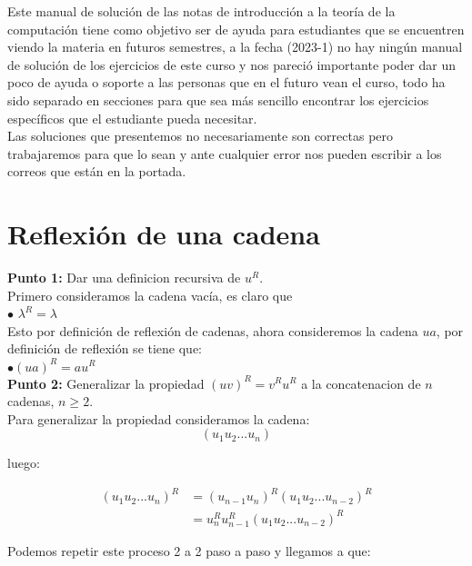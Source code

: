 Este manual de solución de las notas de introducción a la teoría de la computación tiene como objetivo ser de ayuda para estudiantes que se encuentren viendo la materia en futuros semestres, a la fecha (2023-1) no hay ningún manual de solución de los ejercicios de este curso y nos pareció importante poder dar un poco de ayuda o soporte a las personas que en el futuro vean el curso, todo ha sido separado en secciones para que sea más sencillo encontrar los ejercicios específicos que el estudiante pueda necesitar.\\

Las soluciones que presentemos no necesariamente son correctas pero trabajaremos para que lo sean y ante cualquier error nos pueden escribir a los correos que están en la portada.

\section{Reflexión de una cadena}

\textbf{Punto 1: }Dar una definicion recursiva de $u^R.$\\

 Primero consideramos la cadena vacía, es claro que \\

\quad $\bullet$ $\lambda^R=\lambda$\\

Esto por definición de reflexión de cadenas, ahora consideremos la cadena $ua$, por definición de reflexión se tiene que:\\

\quad $\bullet (ua)^R=au^R$\\

\textbf{Punto 2: }Generalizar la propiedad $(uv)^R=v^Ru^R$ a la concatenacion de $n$ cadenas, $n\geq2$.\\

 Para generalizar la propiedad consideramos la cadena:\\

$$(u_1u_2...u_n)$$

luego:

\begin{align*}
(u_1u_2...u_n)^R&=(u_{n-1}u_n)^R(u_1u_2...u_{n-2})^R\\
&=u_n^Ru_{n-1}^R(u_1u_2...u_{n-2})^R
\end{align*}


Podemos repetir este proceso 2 a 2 paso a paso y llegamos a que:

